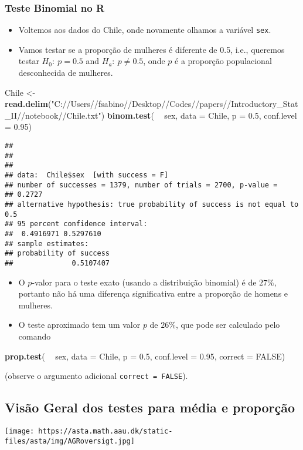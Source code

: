\documentclass[]{article}
\newenvironment{Shaded}{\begin{snugshade}}{\end{snugshade}}
\newcommand{\KeywordTok}[1]{\textcolor[rgb]{0.13,0.29,0.53}{\textbf{#1}}}
\newcommand{\DataTypeTok}[1]{\textcolor[rgb]{0.13,0.29,0.53}{#1}}
\newcommand{\FloatTok}[1]{\textcolor[rgb]{0.00,0.00,0.81}{#1}}
\newcommand{\StringTok}[1]{\textcolor[rgb]{0.31,0.60,0.02}{#1}}
\newcommand{\OtherTok}[1]{\textcolor[rgb]{0.56,0.35,0.01}{#1}}
\newcommand{\OperatorTok}[1]{\textcolor[rgb]{0.81,0.36,0.00}{\textbf{#1}}}
\newcommand{\NormalTok}[1]{#1}
\providecommand{\tightlist}{%
  \setlength{\itemsep}{0pt}\setlength{\parskip}{0pt}}
\begin{document}
\subsubsection{\texorpdfstring{Teste Binomial no
\textbf{R}}{Teste Binomial no R}}\label{teste-binomial-no-r}

\begin{itemize}
\tightlist
\item
  Voltemos aos dados do Chile, onde novamente olhamos a variável
  \texttt{sex}.
\item
  Vamos testar se a proporção de mulheres é diferente de 0.5, i.e.,
  queremos testar \(H_0:\ p=0.5\) and \(H_a:\ p \neq 0.5\), onde \(p\) é
  a proporção populacional desconhecida de mulheres.
\end{itemize}

\begin{Shaded}
\begin{Highlighting}[]
\NormalTok{Chile <-}\StringTok{ }\KeywordTok{read.delim}\NormalTok{(}\StringTok{"C://Users//fsabino//Desktop//Codes//papers//Introductory_Stat_II//notebook//Chile.txt"}\NormalTok{)}
\KeywordTok{binom.test}\NormalTok{( }\OperatorTok{~}\StringTok{ }\NormalTok{sex, }\DataTypeTok{data =}\NormalTok{ Chile, }\DataTypeTok{p =} \FloatTok{0.5}\NormalTok{, }\DataTypeTok{conf.level =} \FloatTok{0.95}\NormalTok{)}
\end{Highlighting}
\end{Shaded}

\begin{verbatim}
## 
## 
## 
## data:  Chile$sex  [with success = F]
## number of successes = 1379, number of trials = 2700, p-value =
## 0.2727
## alternative hypothesis: true probability of success is not equal to 0.5
## 95 percent confidence interval:
##  0.4916971 0.5297610
## sample estimates:
## probability of success 
##              0.5107407
\end{verbatim}

\begin{itemize}
\tightlist
\item
  O \(p\)-valor para o teste exato (usando a distribuição binomial) é de
  \(27\%\), portanto não há uma diferença significativa entre a
  proporção de homens e mulheres.
\item
  O teste aproximado tem um valor \(p\) de \(26\%\), que pode ser
  calculado pelo comando
\end{itemize}

\begin{Shaded}
\begin{Highlighting}[]
\KeywordTok{prop.test}\NormalTok{( }\OperatorTok{~}\StringTok{ }\NormalTok{sex, }\DataTypeTok{data =}\NormalTok{ Chile, }\DataTypeTok{p =} \FloatTok{0.5}\NormalTok{, }\DataTypeTok{conf.level =} \FloatTok{0.95}\NormalTok{, }\DataTypeTok{correct =} \OtherTok{FALSE}\NormalTok{)}
\end{Highlighting}
\end{Shaded}

(observe o argumento adicional \texttt{correct\ =\ FALSE}).

\subsection{Visão Geral dos testes para média e
proporção}\label{visao-geral-dos-testes-para-media-e-proporcao}

\texttt{[image: https://asta.math.aau.dk/static-files/asta/img/AGRoversigt.jpg]}
\end{document}
